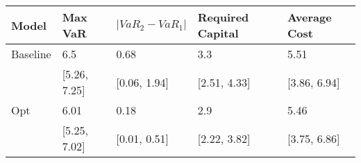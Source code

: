 \begin{tabular}{lllll}
\toprule
   Model &      Max VaR & $|VaR_2 - VaR_1|$ & Required Capital & Average Cost \\
\midrule
Baseline &          6.5 &              0.68 &              3.3 &         5.51 \\
         & [5.26, 7.25] &      [0.06, 1.94] &     [2.51, 4.33] & [3.86, 6.94] \\
     Opt &         6.01 &              0.18 &              2.9 &         5.46 \\
         & [5.25, 7.02] &      [0.01, 0.51] &     [2.22, 3.82] & [3.75, 6.86] \\
\bottomrule
\end{tabular}
